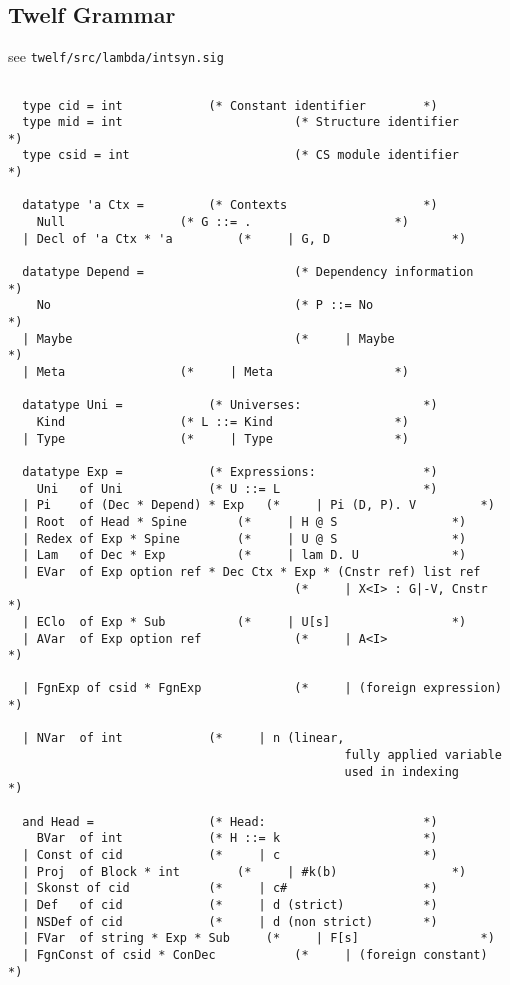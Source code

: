 \subsection{Twelf Grammar}

see \texttt{twelf/src/lambda/intsyn.sig}

\begin{verbatim} 

  type cid = int			(* Constant identifier        *)
  type mid = int                        (* Structure identifier       *)
  type csid = int                       (* CS module identifier       *)

  datatype 'a Ctx =			(* Contexts                   *)
    Null				(* G ::= .                    *)
  | Decl of 'a Ctx * 'a			(*     | G, D                 *)

  datatype Depend =                     (* Dependency information     *)
    No                                  (* P ::= No                   *)
  | Maybe                               (*     | Maybe                *)
  | Meta				(*     | Meta                 *)

  datatype Uni =			(* Universes:                 *)
    Kind				(* L ::= Kind                 *)
  | Type				(*     | Type                 *)

  datatype Exp =			(* Expressions:               *)
    Uni   of Uni			(* U ::= L                    *)
  | Pi    of (Dec * Depend) * Exp	(*     | Pi (D, P). V         *)
  | Root  of Head * Spine		(*     | H @ S                *)
  | Redex of Exp * Spine		(*     | U @ S                *)
  | Lam   of Dec * Exp			(*     | lam D. U             *)
  | EVar  of Exp option ref * Dec Ctx * Exp * (Cnstr ref) list ref
                                        (*     | X<I> : G|-V, Cnstr   *)
  | EClo  of Exp * Sub			(*     | U[s]                 *)
  | AVar  of Exp option ref             (*     | A<I>                 *)

  | FgnExp of csid * FgnExp             (*     | (foreign expression) *)

  | NVar  of int			(*     | n (linear, 
                                               fully applied variable
                                               used in indexing       *)

  and Head =				(* Head:                      *)
    BVar  of int			(* H ::= k                    *)
  | Const of cid			(*     | c                    *)
  | Proj  of Block * int		(*     | #k(b)                *)
  | Skonst of cid			(*     | c#                   *)
  | Def   of cid			(*     | d (strict)           *)
  | NSDef of cid			(*     | d (non strict)       *)
  | FVar  of string * Exp * Sub		(*     | F[s]                 *)
  | FgnConst of csid * ConDec           (*     | (foreign constant)   *)


\end{verbatim}
